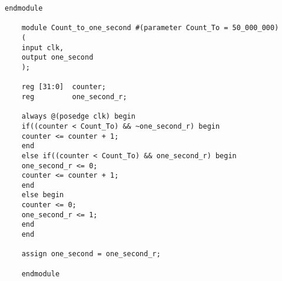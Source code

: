 \begin{lstlisting}[style=verilog]
	endmodule 
	
	module Count_to_one_second #(parameter Count_To = 50_000_000)
	(
	input clk,
	output one_second
	);
	
	reg [31:0]  counter;
	reg         one_second_r;
	
	always @(posedge clk) begin
	if((counter < Count_To) && ~one_second_r) begin
	counter <= counter + 1;
	end
	else if((counter < Count_To) && one_second_r) begin
	one_second_r <= 0;
	counter <= counter + 1;
	end
	else begin
	counter <= 0;
	one_second_r <= 1;
	end
	end
	
	assign one_second = one_second_r;
	
	endmodule
	\end{lstlisting}
	
\ifx\allfiles\undefined

\else
\fi

